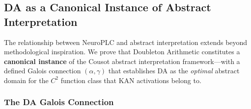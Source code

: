 \subsection{DA as a Canonical Instance of Abstract Interpretation}
\label{sec:galois}

The relationship between NeuroPLC and abstract interpretation
\cite{cousot1977abstract} extends beyond methodological inspiration.
We prove that Doubleton Arithmetic constitutes a \textbf{canonical
instance} of the Cousot abstract interpretation framework---with a
defined Galois connection $(\alpha, \gamma)$ that establishes DA as
the \textit{optimal} abstract domain for the $C^2$ function class
that KAN activations belong to.

\subsubsection{The DA Galois Connection}


